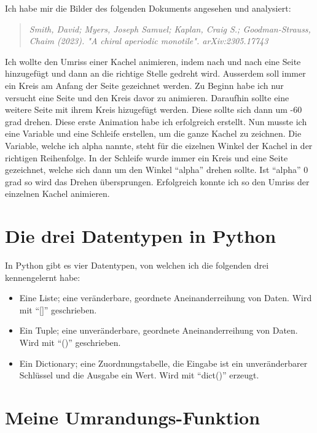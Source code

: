 \documentclass[a4paper]{article} %
\begin{document}
    Ich habe mir die Bilder des folgenden Dokuments angesehen und analysiert:

    \begin{quote}
        \textsl{Smith, David; Myers, Joseph Samuel; Kaplan, Craig S.; Goodman-Strauss, Chaim (2023). "A chiral aperiodic monotile". arXiv:2305.17743}
    \end{quote}

    Ich wollte den Umriss einer Kachel animieren, indem nach und nach 
    eine Seite hinzugefügt und dann an die richtige Stelle gedreht wird.
    Ausserdem soll immer ein Kreis am Anfang der Seite gezeichnet werden.
    Zu Beginn habe ich nur versucht eine Seite und den Kreis davor zu animieren.
    Daraufhin sollte eine weitere Seite mit ihrem Kreis hizugefügt werden.
    Diese sollte sich dann um -60 grad drehen.
    Diese erste Animation habe ich erfolgreich erstellt.
    Nun musste ich eine Variable und eine Schleife erstellen,
    um die ganze Kachel zu zeichnen.
    Die Variable, welche ich alpha nannte, steht für 
    die eizelnen Winkel der Kachel in der richtigen Reihenfolge.
    In der Schleife wurde immer ein Kreis und eine Seite gezeichnet,
    welche sich dann um den Winkel ``alpha'' drehen sollte.
    Ist ``alpha'' 0 grad so wird das Drehen übersprungen.
    Erfolgreich konnte ich so den Umriss der einzelnen Kachel animieren.

    \section{Die drei Datentypen in Python} %

    In Python gibt es vier Datentypen, von welchen ich die folgenden drei kennengelernt habe:

    \begin{itemize}
        \item Eine Liste; eine veränderbare, geordnete Aneinanderreihung von Daten. Wird mit ``[]'' geschrieben.
        \item Ein Tuple; eine unveränderbare, geordnete Aneinanderreihung von Daten. Wird mit ``()'' geschrieben.
        \item Ein Dictionary; eine Zuordnungstabelle, die Eingabe ist ein unveränderbarer Schlüssel und die Ausgabe ein Wert. Wird mit ``dict()'' erzeugt.
    \end{itemize}
  
    \section{Meine Umrandungs-Funktion} %
\end{document}
